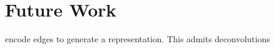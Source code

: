 \chapter{Future Work}
\label{chap:future}

encode edges to generate a representation. This admits deconvolutions